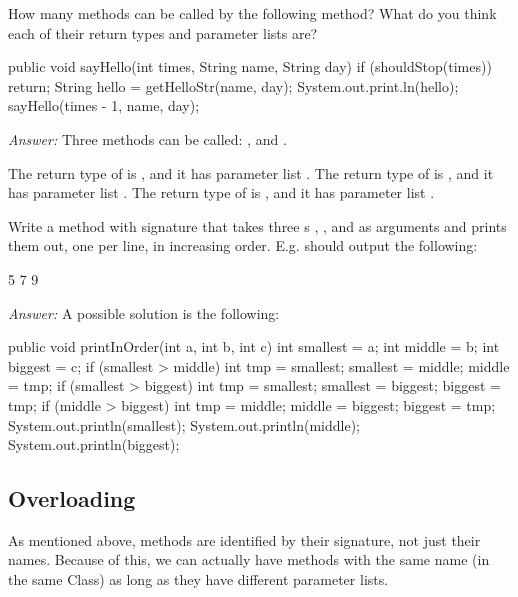 \begin{example}
How many methods can be called by the following method?
What do you think each of their return types and parameter lists are?

\begin{code}
public void sayHello(int times, String name, String day) {
  if (shouldStop(times))
    return;
  String hello = getHelloStr(name, day);
  System.out.print.ln(hello);
  sayHello(times - 1, name, day);
}
\end{code}
\noindent \emph{Answer:}
Three methods can be called: ,  and .

The return type of  is , and it has parameter list .
The return type of  is , and it has parameter list .
The return type of  is , and it has parameter list .
\end{example}

\begin{example}
Write a method with signature  that takes
three s , , and  as arguments and prints them out,
one per line, in increasing order. E.g.  should output the following:
\begin{code}
5
7
9
\end{code}

\noindent \emph{Answer:}
A possible solution is the following:
\begin{code}
public void printInOrder(int a, int b, int c) {
  int smallest = a;
  int middle = b;
  int biggest = c;
  if (smallest > middle) {
    int tmp = smallest;
    smallest = middle;
    middle = tmp;
  }
  if (smallest > biggest) {
    int tmp = smallest;
    smallest = biggest;
    biggest = tmp;
  }
  if (middle > biggest) {
    int tmp = middle;
    middle = biggest;
    biggest = tmp;
  }
  System.out.println(smallest);
  System.out.println(middle);
  System.out.println(biggest);
}
\end{code}
\end{example}

\subsection{Overloading}
As mentioned above, methods are identified by their signature, not just their names.
Because of this, we can actually have methods with the same name (in the same
Class) as long as they have different parameter lists.

